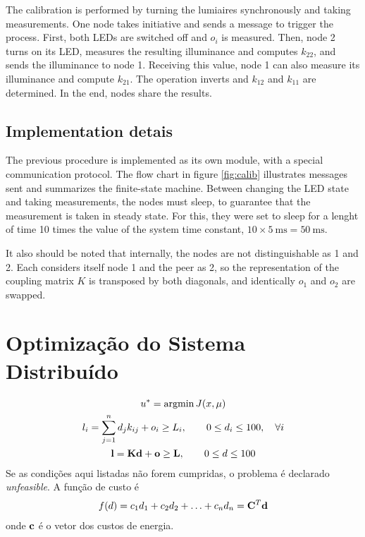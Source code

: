 \documentclass[english,palatino]{ist-report}
\begin{document}
The calibration is performed by turning the lumiaires synchronously and taking measurements. One node takes initiative and sends a message to trigger the process. First, both LEDs are switched off and $o_i$ is measured.
Then, node 2 turns on its LED, measures the resulting illuminance and computes $k_{22}$, and sends the illuminance to node 1. Receiving this value, node 1 can also measure its illuminance and compute $k_{21}$. The operation inverts and $k_{12}$ and $k_{11}$ are determined. In the end, nodes share the results.

\subsection{Implementation detais}

The previous procedure is implemented as its own module, with a special communication protocol. The flow chart in figure \ref{fig:calib} illustrates messages sent and summarizes the finite-state machine.
Between changing the LED state and taking measurements, the nodes must sleep, to guarantee that the measurement is taken in steady state. For this, they were set to sleep for a lenght of time 10 times the value of the system time constant, $10 \times \SI{5}{\milli \second} = \SI{50}{\milli \second}$. 

It also should be noted that internally, the nodes are not distinguishable as 1 and 2. Each considers itself node 1 and the peer as 2, so the representation of the coupling matrix $K$ is transposed by both diagonals, and identically $o_1$ and $o_2$ are swapped.

\section{Optimização do Sistema Distribuído}

\begin{gather*}
	u^* = \textrm{argmin}\,J(x, \mu) \\
	l_i = \sum^n_{j=1} d_j k_{ij} + o_i \geq L_i, \qquad 0 \leq d_i \leq 100, \quad \forall i \\
	\mathbf{l} = \mathbf{K}\mathbf{d} + \mathbf{o} \geq \mathbf{L}, \qquad 0 \leq d \leq 100
\end{gather*}
Se as condições aqui listadas não forem cumpridas, o problema é declarado \textit{unfeasible}. A função de custo é
\begin{gather*}
	f(d) = c_1d_1 + c_2d_2 + \ldots + c_nd_n = \mathbf{C}^T\mathbf{d}
\end{gather*}
onde $\mathbf{c}$ é o vetor dos custos de energia.
\end{document}
